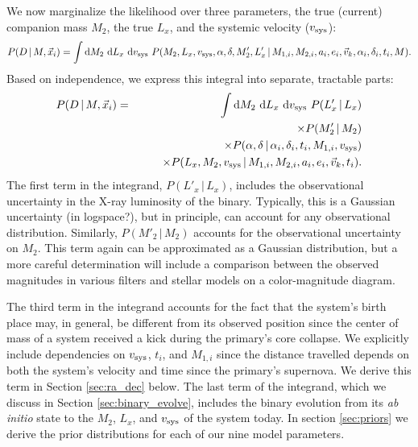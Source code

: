 \documentclass[12pt, preprint]{aastex}
\newcommand{\given}{\,|\,}
\newcommand{\dd}{\mathrm{d}}
\begin{document}
We now marginalize the likelihood over three parameters, the true (current) companion mass $M_2$, the true $L_x$, and the systemic velocity ($v_{\rm sys}$):
\begin{equation}
P(D \given M, \vec{x}_i) =  \int \dd M_2\ \dd L_x\ \dd v_{\rm sys}\ P( M_2, L_x, v_{\rm sys}, \alpha, \delta, M'_2, L'_x \given M_{1,i}, M_{2,i}, a_i, e_i, \vec{v}_k, \alpha_i, \delta_i, t_i, M).
\end{equation}
Based on independence, we express this integral into separate, tractable parts:
\begin{eqnarray}
P(D \given M, \vec{x}_i) &=&  \int \dd M_2\ \dd L_x\ \dd v_{\rm sys}\ P(L'_x \given L_x) \nonumber \\
	& & \qquad \times P(M'_2 \given M_2) \nonumber \\
	& & \qquad \times P(\alpha, \delta \given \alpha_i, \delta_i, t_i, M_{1,i}, v_{\rm sys}) \nonumber \\
	& & \qquad \times P(L_x, M_2, v_{\rm sys} \given M_{1,i}, M_{2,i}, a_i, e_i, \vec{v}_k, t_i). \label{eq:marginalized}
\end{eqnarray}
The first term in the integrand, $P(L'_x \given L_x)$, includes the observational uncertainty in the X-ray luminosity of the binary. Typically, this is a Gaussian uncertainty (in logspace?), but in principle, can account for any observational distribution. Similarly, $P(M'_2 \given M_2)$ accounts for the observational uncertainty on $M_2$. This term again can be approximated as a Gaussian distribution, but a more careful determination will include a comparison between the observed magnitudes in various filters and stellar models on a color-magnitude diagram. 

The third term in the integrand accounts for the fact that the system's birth place may, in general, be different from its observed position since the center of mass of a system received a kick during the primary's core collapse. We explicitly include dependencies on $v_{\rm sys}$, $t_i$, and $M_{1,i}$ since the distance travelled depends on both the system's velocity and time since the primary's supernova. We derive this term in Section \ref{sec:ra_dec} below. The last term of the integrand, which we discuss in Section \ref{sec:binary_evolve}, includes the binary evolution from its {\it ab initio} state to the $M_2$, $L_x$, and $v_{\rm sys}$ of the system today. In section \ref{sec:priors} we derive the prior distributions for each of our nine model parameters.
\end{document}
